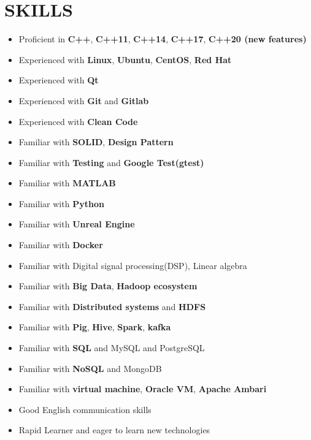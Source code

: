 \documentclass[11pt,a4paper,roman]{moderncv}
\begin{document}
{{\section{SKILLS}
\begin{minipage}{\maincolumnwidth}%
  \small{
      \begin{itemize}
	  \item Proficient  in \textbf{C++}, \textbf{C++11}, \textbf{C++14}, \textbf{C++17}, \textbf{C++20 (new features)}
          \item Experienced with \textbf{Linux}, \textbf{Ubuntu}, \textbf{CentOS}, \textbf{Red Hat}
          \item Experienced with \textbf{Qt}
          \item Experienced with \textbf{Git} and \textbf{Gitlab}
	  \item Experienced with \textbf{Clean Code}
	  \item Familiar with \textbf{SOLID}, \textbf{Design Pattern}
	  \item Familiar with \textbf{Testing} and \textbf{Google Test(gtest)}
	  \item Familiar with \textbf{MATLAB}
	  \item Familiar with \textbf{Python}
	  \item Familiar with \textbf{Unreal Engine}
	  \item Familiar with \textbf{Docker}
	  \item Familiar with Digital signal processing(DSP), Linear algebra
	  \item Familiar with \textbf{Big Data}, \textbf{Hadoop ecosystem}
	  \item Familiar with \textbf{Distributed systems} and \textbf{HDFS}
	  \item Familiar with \textbf{Pig}, \textbf{Hive}, \textbf{Spark}, \textbf{kafka}
	  \item Familiar with \textbf{SQL} and MySQL and PostgreSQL
	  \item Familiar with \textbf{NoSQL} and MongoDB
	  \item Familiar with \textbf{virtual machine}, \textbf{Oracle VM}, \textbf{Apache Ambari}
          \item Good English communication skills
          \item Rapid Learner and eager to learn new technologies
    \end{itemize}}%
\end{minipage}%
      
}

}

\nocite{*}

 
\end{document}
